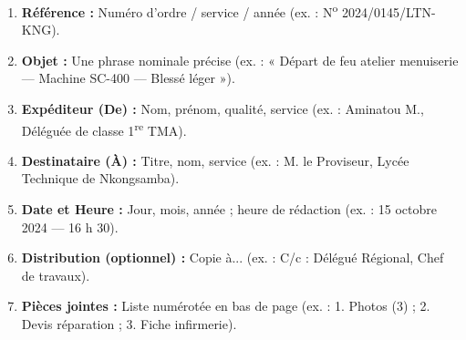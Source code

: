 \documentclass[11pt]{article}
\begin{document}
\begin{definition}
\begin{enumerate}
    \item \textbf{Référence :} Numéro d'ordre / service / année (ex. : N\textsuperscript{o} 2024/0145/LTN-KNG).
    \item \textbf{Objet :} Une phrase nominale précise (ex. : « Départ de feu atelier menuiserie — Machine SC-400 — Blessé léger »).
    \item \textbf{Expéditeur (De) :} Nom, prénom, qualité, service (ex. : Aminatou M., Déléguée de classe 1\textsuperscript{re} TMA).
    \item \textbf{Destinataire (À) :} Titre, nom, service (ex. : M. le Proviseur, Lycée Technique de Nkongsamba).
    \item \textbf{Date et Heure :} Jour, mois, année ; heure de rédaction (ex. : 15 octobre 2024 — 16 h 30).
    \item \textbf{Distribution (optionnel) :} Copie à... (ex. : C/c : Délégué Régional, Chef de travaux).
    \item \textbf{Pièces jointes :} Liste numérotée en bas de page (ex. : 1. Photos (3) ; 2. Devis réparation ; 3. Fiche infirmerie).
\end{enumerate}
\end{definition}
\end{document}
